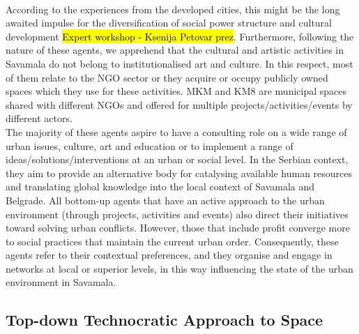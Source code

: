 \documentclass[11pt]{report}
\begin{document}
\\
According to the experiences from the developed cities, this might be the long awaited impulse for the diversification of social power structure and cultural development \hl{Expert workshop - Ksenija Petovar prez}.
Furthermore, following the nature of these agents, we apprehend that the cultural and artistic activities in Savamala do not belong to institutionalised art and culture. In this respect, most of them relate to the NGO sector or they acquire or occupy publicly owned spaces which they use for these activities. MKM and KM8 are municipal spaces shared with different NGOs and offered for multiple projects/activities/events by different actors.
\\
The majority of these agents aspire to have a consulting role on a wide range of urban issues, culture, art and education or to implement a range of ideas/solutions/interventions at an urban or social level.
In the Serbian context, they aim to provide an alternative body for catalysing available human resources and translating global knowledge into the local context of Savamala and Belgrade.
All bottom-up agents that have an active approach to the urban environment (through projects, activities and events) also direct their initiatives toward solving urban conflicts. However, those that include profit converge more to social practices that maintain the current urban order. Consequently, these agents refer to their contextual preferences, and they organise and engage in networks at local or superior levels, in this way influencing the state of the urban environment in Savamala.
    
\subsection{Top-down Technocratic Approach to Space}
\end{document}
